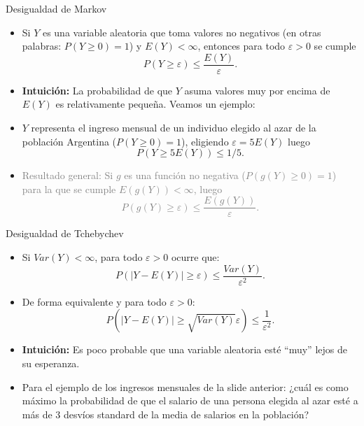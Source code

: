 \documentclass{beamer}
\theoremstyle{definition}
\begin{document}
\begin{frame}{\color{rosee}Desigualdad de Markov} \small
    \begin{itemize}
    \item Si $Y$ es una variable aleatoria que toma valores no negativos (en otras palabras: $P(Y\geq 0)=1$) y $E(Y)<\infty$, entonces para todo $\varepsilon>0$ se cumple
      \begin{equation*}
        P\left(  Y \geq \varepsilon \right)\leq
        \frac{E( Y )}{\varepsilon}.      \end{equation*}
    \item \textbf{Intuición:} La probabilidad de que $Y$ asuma valores muy por encima de $E(Y)$ es relativamente pequeña. Veamos un ejemplo:\medskip
    \item $Y$ representa el ingreso mensual de un individuo elegido al azar de la población Argentina ($P(Y\geq 0)=1$), eligiendo $\varepsilon=5 E(Y)$ luego 
    $$P\left( Y \geq 5 E(Y) \right) \leq 1/5.$$
\item \textcolor{gray}{Resultado general: Si $g$ es una función no negativa ({\small$P(g(Y)\geq 0)=1$}) para la que se cumple $E(g(Y))<\infty$, luego                  
      \begin{equation*}
        P\left(  g(Y) \geq \varepsilon \right)\leq
        \frac{E( g(Y) )}{\varepsilon}.      \end{equation*}}
        
            \end{itemize}
  
\end{frame}



\begin{frame}{\color{rosee}Desigualdad de Tchebychev} \small
    \begin{itemize}
    \item Si $Var(Y)< \infty$, para todo $\varepsilon>0$ ocurre que:
      \begin{equation*}
        P\left( \vert Y - E(Y)\vert \geq \varepsilon \right)\leq 
        \frac{Var(Y)}{\varepsilon^{2}}.
      \end{equation*}
\item De forma equivalente y para todo $\varepsilon>0$:
            \begin{equation*}
        P\left( \vert Y - E(Y)\vert \geq \sqrt{Var(Y)}\varepsilon \right)\leq 
        \frac{1}{\varepsilon^{2}}.
      \end{equation*}
      
      \item\textbf{ Intuición:} Es poco probable que una variable aleatoria   est\'e ``muy'' lejos de su esperanza. 
      
      \item Para el ejemplo de los ingresos mensuales de la slide anterior: ¿cuál es como máximo la probabilidad de que el salario de una persona elegida al azar esté a más de 3 desvíos standard de la media de salarios en la población?  
        \end{itemize}
 
\end{frame}
\end{document}
